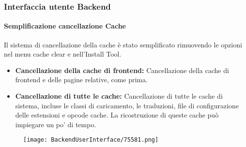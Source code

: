 \begin{frame}[fragile]
	\frametitle{Interfaccia utente Backend}
	\framesubtitle{Semplificazione cancellazione Cache}

	Il sistema di cancellazione della cache è stato semplificato rimuovendo le opzioni nel menu cache clear e
	nell'Install Tool.

	\begin{itemize}

		\item \textbf{Cancellazione della cache di frontend:}\newline
			\small
				Cancellazione della cache di frontend e delle pagine relative, come prima.
			\normalsize

		\item \textbf{Cancellazione di tutte le cache:}\newline
			\small
				Cancellazione di tutte le cache di sistema, incluse le classi di caricamento, le traduzioni,
				file di configurazione delle estensioni e opcode cache. La ricostruzione di queste cache
				può impiegare un po' di tempo.
			\normalsize

	\end{itemize}

	\begin{figure}
		\texttt{[image: BackendUserInterface/75581.png]}
	\end{figure}

\end{frame}

